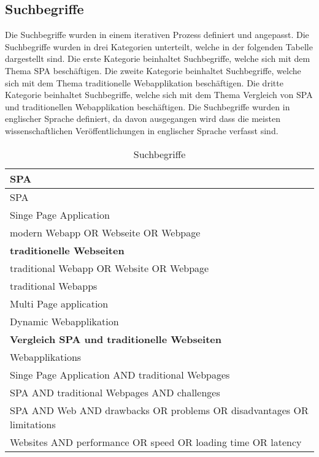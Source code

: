 \subsection{Suchbegriffe}
Die Suchbegriffe wurden in einem iterativen Prozess definiert und angepasst.
Die Suchbegriffe wurden in drei Kategorien unterteilt, welche in der folgenden Tabelle dargestellt sind.
Die erste Kategorie beinhaltet Suchbegriffe, welche sich mit dem Thema \ac{SPA} beschäftigen.
Die zweite Kategorie beinhaltet Suchbegriffe, welche sich mit dem Thema traditionelle Webapplikation beschäftigen.
Die dritte Kategorie beinhaltet Suchbegriffe, welche sich mit dem Thema Vergleich von \ac{SPA} und traditionellen Webapplikation beschäftigen.
Die Suchbegriffe wurden in englischer Sprache definiert, da davon ausgegangen wird dass die meisten wissenschaftlichen Veröffentlichungen in englischer Sprache verfasst sind.

\begin{table}[H]
    \caption{Suchbegriffe}
    \label{tbl:suchbegriffe}
    \begin{tabularx}{\textwidth}[ht]{|X|}
        \hline
        \textbf{\ac{SPA}}                                                     \\
        \hline\hline
        \ac{SPA}                                                              \\
        Singe Page Application                                                \\
        modern Webapp OR Webseite OR Webpage                                  \\
        \hline\hline
        \hline
        \textbf{traditionelle Webseiten}                                      \\
        \hline\hline
        traditional Webapp OR Website OR Webpage                              \\
        traditional Webapps                                                   \\
        Multi Page application                                                \\
        Dynamic Webapplikation                                                \\
        \hline\hline
        \hline
        \textbf{Vergleich \ac{SPA} und traditionelle Webseiten}               \\
        \hline\hline
        Webapplikations                                                       \\
        Singe Page Application AND traditional Webpages                       \\
        SPA AND traditional Webpages AND challenges                           \\
        SPA AND Web AND drawbacks OR problems OR disadvantages OR limitations \\
        Websites AND performance OR speed OR loading time OR latency          \\
        \hline
    \end{tabularx}
\end{table}

